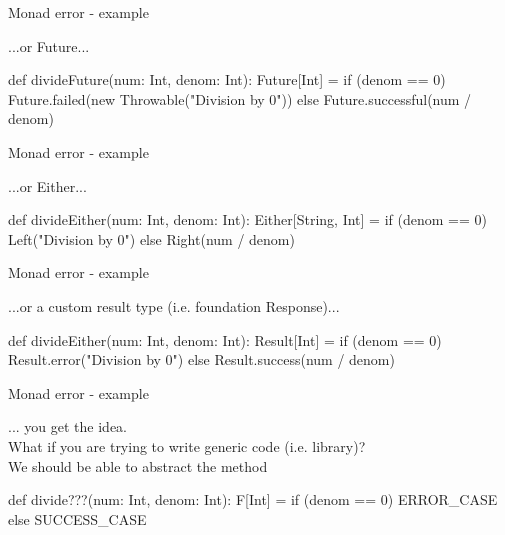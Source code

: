 \documentclass[13pt]{beamer}
\begin{document}
\begin{frame}[fragile]{Monad error - example}

  ...or Future...

  \begin{scalaCode}
    def divideFuture(num: Int, denom: Int): Future[Int] =
      if (denom == 0) Future.failed(new Throwable("Division by 0"))
      else Future.successful(num / denom)
  \end{scalaCode}

\end{frame}

\begin{frame}[fragile]{Monad error - example}

  ...or Either...

  \begin{scalaCode}
    def divideEither(num: Int, denom: Int): Either[String, Int] =
      if (denom == 0) Left("Division by 0")
      else Right(num / denom)
  \end{scalaCode}

\end{frame}

\begin{frame}[fragile]{Monad error - example}

  ...or a custom result type (i.e. foundation Response)...

  \begin{scalaCode}
    def divideEither(num: Int, denom: Int): Result[Int] =
      if (denom == 0) Result.error("Division by 0")
      else Result.success(num / denom)
  \end{scalaCode}

\end{frame}


\begin{frame}[fragile]{Monad error - example}

  ... you get the idea.\\

  What if you are trying to write generic code (i.e. library)?\\
  We should be able to abstract the method

  \begin{scalaCode}
    def divide???(num: Int, denom: Int): F[Int] =
      if (denom == 0) ERROR_CASE
      else SUCCESS_CASE
  \end{scalaCode}

\end{frame}
\end{document}
